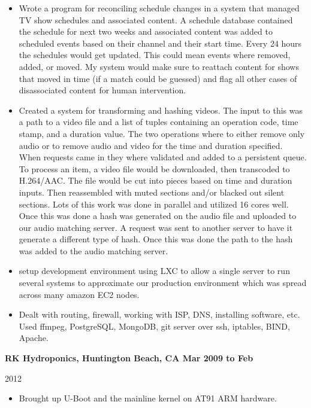 \documentclass{res}
\begin{document}
\begin{resume}
\begin{itemize}
\item
Wrote a program for reconciling schedule changes in a system that managed
TV show schedules and associated content.  A schedule database
contained the schedule for next two weeks and associated content was
added to scheduled events based on their channel and their start time.
Every 24 hours the schedules would get updated.  This could mean events
where removed, added, or moved.  My system would make sure to reattach
content for shows that moved in time (if a match could be guessed) and flag
all other cases of disassociated content for human intervention.

\item

Created a system for transforming and hashing videos.  The input to this
was a path to a video file and a list of tuples containing an operation code,
time stamp, and a duration value.  The two operations where to either remove
only audio or to remove audio and video for the time and duration specified.
When requests came in they where validated and added to a
persistent queue.  To process an item, a video file would be downloaded, then
transcoded to H.264/AAC.  The file would be cut into pieces based on time and
duration inputs.  Then reassembled with muted sections and/or blacked out
silent sections.  Lots of this work was done in parallel and utilized
16 cores well.  Once this was done a hash was generated on the audio file
and uploaded to our audio matching server.  A request was sent to another 
server to have it generate a different type of hash.  Once this was done
the path to the hash was added to the audio matching server.

\item setup  development  environment using LXC to allow a single server
to run several systems to approximate our production environment which
was spread across many amazon EC2 nodes.

\item Dealt with routing, firewall, working with ISP, DNS,
installing software, etc.  Used ffmpeg, PostgreSQL, MongoDB, git server
over ssh, iptables, BIND, Apache. 

\end{itemize}


{\large \bf RK Hydroponics, Huntington Beach, CA \hfill Mar 2009 to Feb

2012} \begin{itemize}

\item Brought up U-Boot and the mainline kernel on AT91 ARM hardware.


\end{itemize}
\end{resume}
\end{document}
